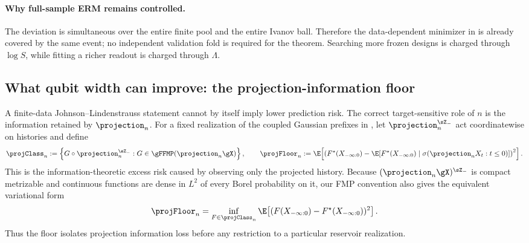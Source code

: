 \paragraph{Why full-sample ERM remains controlled.}
The deviation is simultaneous over the entire finite pool and the entire
Ivanov ball.  Therefore the data-dependent minimizer in
 is already covered by the same event; no independent
validation fold is required for the theorem.  Searching more frozen designs
is charged through $\log S$, while fitting a richer readout is charged through
$\Lambda$.

\subsection{What qubit width can improve: the projection-information floor}
\label{sec:width-resolved-approximation}

A finite-data Johnson--Lindenstrauss statement cannot by itself imply lower
prediction risk.  The correct target-sensitive role of $n$ is the information
retained by $\projection_n$.  For a fixed realization of the coupled Gaussian
prefixes in , let $\projection_n^{\sZ_-}$ act
coordinatewise on histories and define
\begin{equation}
    \projClass_n
    :=\left\{
      G\circ\projection_n^{\sZ_-}:
      G\in\gFFMP(\projection_n\gX)
    \right\},
    \qquad
    \projFloor_n
    :=\E\!\left[
      \left(
        F^\star(X_{-\infty:0})
        -\E\!\left[F^\star(X_{-\infty:0})\mid
          \sigma(\projection_nX_t:t\leq0)\right]
      \right)^2
    \right].
    \label{eq:projection-information-floor}
\end{equation}
This is the information-theoretic excess risk caused by observing only the
projected history.  Because $(\projection_n\gX)^{\sZ_-}$ is compact metrizable
and continuous functions are dense in $L^2$ of every Borel probability on it,
our FMP convention also gives the equivalent variational form
\begin{equation}
    \projFloor_n
    =\inf_{F\in\projClass_n}
      \E\!\left[(F(X_{-\infty:0})-F^\star(X_{-\infty:0}))^2\right].
    \label{eq:projection-floor-variational}
\end{equation}
Thus the floor isolates projection information loss before any restriction to
a particular reservoir realization.

